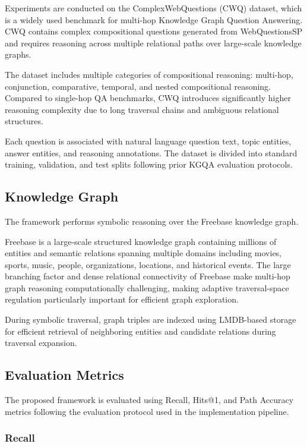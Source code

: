 \documentclass[10pt,conference]{IEEEtran}
\begin{document}
Experiments are conducted on the ComplexWebQuestions (CWQ) dataset, which is a widely used benchmark for multi-hop Knowledge Graph Question Answering. CWQ contains complex compositional questions generated from WebQuestionsSP and requires reasoning across multiple relational paths over large-scale knowledge graphs.

The dataset includes multiple categories of compositional reasoning: multi-hop, conjunction, comparative, temporal, and nested compositional reasoning. Compared to single-hop QA benchmarks, CWQ introduces significantly higher reasoning complexity due to long traversal chains and ambiguous relational structures.

Each question is associated with natural language question text, topic entities, answer entities, and reasoning annotations. The dataset is divided into standard training, validation, and test splits following prior KGQA evaluation protocols.

\subsection{Knowledge Graph}

The framework performs symbolic reasoning over the Freebase knowledge graph.

Freebase is a large-scale structured knowledge graph containing millions of entities and semantic relations spanning multiple domains including movies, sports, music, people, organizations, locations, and historical events. The large branching factor and dense relational connectivity of Freebase make multi-hop graph reasoning computationally challenging, making adaptive traversal-space regulation particularly important for efficient graph exploration.

During symbolic traversal, graph triples are indexed using LMDB-based storage for efficient retrieval of neighboring entities and candidate relations during traversal expansion.

\subsection{Evaluation Metrics}

The proposed framework is evaluated using Recall, Hits@1, and Path Accuracy metrics following the evaluation protocol used in the implementation pipeline.

\subsubsection{Recall}
\end{document}
